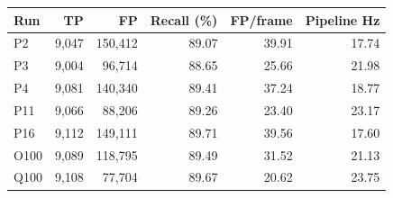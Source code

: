 \begin{tabular}{lrrrrr}
\toprule
Run & TP & FP & Recall (\%) & FP/frame & Pipeline Hz \\
\midrule
P2 & 9,047 & 150,412 & 89.07 & 39.91 & 17.74 \\
P3 & 9,004 & 96,714 & 88.65 & 25.66 & 21.98 \\
P4 & 9,081 & 140,340 & 89.41 & 37.24 & 18.77 \\
P11 & 9,066 & 88,206 & 89.26 & 23.40 & 23.17 \\
P16 & 9,112 & 149,111 & 89.71 & 39.56 & 17.60 \\
O100 & 9,089 & 118,795 & 89.49 & 31.52 & 21.13 \\
Q100 & 9,108 & 77,704 & 89.67 & 20.62 & 23.75 \\
\bottomrule
\end{tabular}
